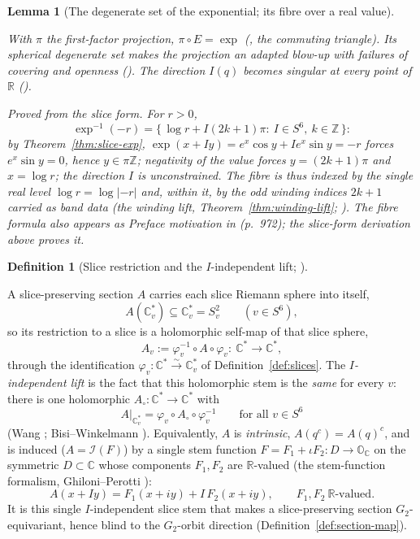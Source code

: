\documentclass[11pt]{article}
\newcommand{\OO}{\mathbb{O}}
\newcommand{\CC}{\mathbb{C}}
\newcommand{\RR}{\mathbb{R}}
\newcommand{\ZZ}{\mathbb{Z}}
\newcommand{\Cstar}{\CC^{*}}
\providecommand{\Gtwo}{G_2}
\providecommand{\lean}[1]{}
\providecommand{\uses}[1]{}
\theoremstyle{plain}
\newtheorem{lemma}[theorem]{Lemma}
\theoremstyle{definition}
\newtheorem{definition}[theorem]{Definition}
\theoremstyle{remark}
\begin{document}
\begin{lemma}[The degenerate set of the exponential; its fibre over a real value]\label{lem:exp-degenerate}
\lean{Octonion.exp_fibre_neg_real, Octonion.exp_eq_neg_ofReal_iff,
Octonion.logManifold_fibre_neg_real, Octonion.degenerate_level_readout}
\uses{thm:slice-exp, thm:log-manifold}
With $\pi$ the first-factor projection, $\pi\circ E=\exp$
\textup{(\cite[Rem.~5.2(a)]{VS}, the commuting triangle)}. Its spherical
\emph{degenerate set} makes the projection an adapted blow-up with failures of covering and
openness \textup{(\cite[Rem.~5.2(b)]{VS})}. The direction $I(q)$ becomes singular at every
point of $\RR$ \textup{(\cite[Rem.~2.1]{GPVwind})}.

\emph{Proved from the slice form.} For $r>0$,
\[
\exp^{-1}(-r)=\bigl\{\,\log r+I(2k{+}1)\pi:\ I\in S^6,\ k\in\ZZ\,\bigr\}:
\]
by Theorem~\ref{thm:slice-exp}, $\exp(x+Iy)=e^{x}\cos y+Ie^{x}\sin y=-r$ forces
$e^{x}\sin y=0$, hence $y\in\pi\ZZ$; negativity of the value forces $y=(2k{+}1)\pi$ and
$x=\log r$; the direction $I$ is unconstrained. The fibre is thus indexed by the single real
\emph{level} $\log r=\log|{-}r|$ and, within it, by the odd winding indices $2k{+}1$ carried as
band data (the winding lift, Theorem~\ref{thm:winding-lift}; \cite[Cor.~5.21]{GPVwind}).
The fibre formula also appears as Preface motivation in \cite{VS}
(p.~972); the slice-form derivation above proves it.
\end{lemma}

\begin{definition}[Slice restriction and the $I$-independent lift; ]\label{def:slice-squares}
\lean{IsIntrinsic, ASection.realize, ASection.realize_mem_sliceSphere,
ASection.realize_equivariant}
A slice-preserving section $A$ carries each slice Riemann sphere into itself,
\[
  A(\CC_v^{*})\subseteq\CC_v^{*}=S^2_v\qquad(v\in S^6),
\]
so its restriction to a slice is a holomorphic self-map of that slice sphere,
\[
  A_v:=\varphi_v^{-1}\circ A\circ\varphi_v:\ \Cstar\longrightarrow\Cstar,
\]
through the identification $\varphi_v:\Cstar\xrightarrow{\sim}\CC_v^{*}$ of
Definition~\ref{def:slices}. The \emph{$I$-independent lift} is the fact that this holomorphic stem is
the \emph{same} for every $v$: there is one holomorphic $A_\circ:\Cstar\to\Cstar$ with
\[
  A|_{\CC_v^{*}}=\varphi_v\circ A_\circ\circ\varphi_v^{-1}\qquad\text{for all }v\in S^6
\]
(Wang \cite[Rem.~2.11]{Wang}; Bisi--Winkelmann \cite[\S3.7]{BisiWinkelmann}). Equivalently, $A$ is
\emph{intrinsic}, $A(q^c)=A(q)^c$, and is induced ($A=\mathcal I(F)$) by a single stem function
$F=F_1+\iota F_2:D\to\OO_{\CC}$ on the symmetric $D\subset\CC$ whose components $F_1,F_2$ are
$\RR$-valued (the stem-function formalism, Ghiloni--Perotti \cite[Def.~2.1, Prop.~2.2]{SeriesExp}):
\[
  A(x+Iy)=F_1(x+iy)+I\,F_2(x+iy),\qquad F_1,F_2\ \RR\text{-valued}.
\]
It is this single $I$-independent slice stem that makes a slice-preserving section
$\Gtwo$-equivariant, hence blind to the $\Gtwo$-orbit direction
(Definition~\ref{def:section-map}).
\end{definition}
\end{document}
